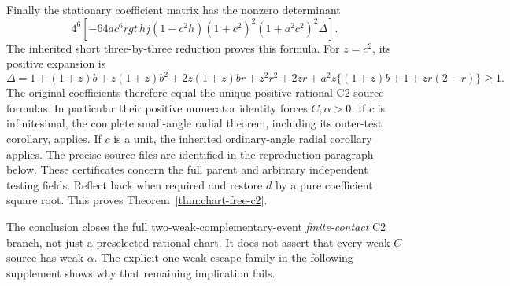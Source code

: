 Finally the stationary coefficient matrix has the nonzero determinant
\[
4^6[-64ac^6rgt\,hj(1-c^2h)(1+c^2)^2(1+a^2c^2)^2\Delta].
\]
The inherited short three-by-three reduction proves this formula.
For \(z=c^2\), its positive expansion is
\[
\Delta=1+(1+z)b+z(1+z)b^2+2z(1+z)br+z^2r^2+2zr
       +a^2z\{(1+z)b+1+zr(2-r)\}\ge1.
\]
The original coefficients
therefore equal the unique positive rational C2 source formulas.
In particular their positive numerator identity forces \(C,\alpha>0\).
If \(c\) is infinitesimal, the complete small-angle radial theorem,
including its outer-test corollary, applies. If \(c\) is a unit,
the inherited ordinary-angle radial corollary applies. The precise
source files are identified in the reproduction paragraph below. These certificates concern
the full parent and arbitrary independent testing fields. Reflect back
when required and restore \(d\) by a pure coefficient square root.
This proves Theorem~\ref{thm:chart-free-c2}.

The conclusion closes the full two-weak-complementary-event
\emph{finite-contact} C2 branch, not just a preselected rational chart.
It does not assert that every weak-\(C\) source has weak \(\alpha\).
The explicit one-weak escape family in the following supplement shows
why that remaining implication fails.
